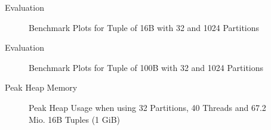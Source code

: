 \begin{frame}{Evaluation}
  \begin{figure}[h]
    \centering
    \begin{subfigure}{.49\textwidth}
      \centering
      \resizebox{\linewidth}{!}{}
    \end{subfigure}
    \begin{subfigure}{.49\textwidth}
      \centering
      \resizebox{\linewidth}{!}{}
    \end{subfigure}
    \begin{subfigure}{\textwidth}
      \centering
      \resizebox{\linewidth}{!}{}
    \end{subfigure}
    \caption[Shuffle Benchmark Plots for Tuple of 16B with 32 and 1024 Partitions]{Benchmark Plots for Tuple of 16B with 32 and 1024 Partitions}
    \label{plot-shuffle-16B-32-1024}
  \end{figure}
\end{frame}

\begin{frame}{Evaluation}
  \begin{figure}[h]
    \centering
    \begin{subfigure}{.49\textwidth}
      \centering
      \resizebox{\linewidth}{!}{}
    \end{subfigure}
    \begin{subfigure}{.49\textwidth}
      \centering
      \resizebox{\linewidth}{!}{}
    \end{subfigure}
    \begin{subfigure}{\textwidth}
      \centering
      \resizebox{\linewidth}{!}{}
    \end{subfigure}
    \caption[Shuffle Benchmark Plots for Tuple of 100B with 32 and 1024 Partitions]{Benchmark Plots for Tuple of 100B with 32 and 1024 Partitions}
    \label{plot-shuffle-100B-32-1024}
  \end{figure}
\end{frame}
\begin{frame}{Peak Heap Memory}
  \begin{figure}[h]
    \centering
    \resizebox{.85\linewidth}{!}{}
    \caption[Peak Heap Memory Benchmark Plot]{Peak Heap Usage when using 32 Partitions, 40 Threads and 67.2 Mio.
      16B Tuples (1 GiB)} \label{plot-heap-16B-P32-Th40}
  \end{figure}
\end{frame}

